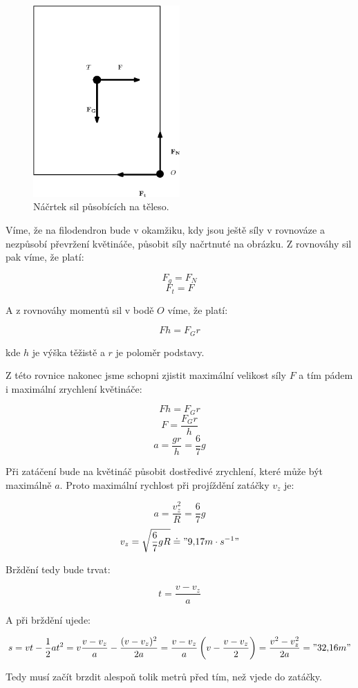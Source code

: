 \documentclass{fkssolpub}
\author{Ondřej Sedláček}
\begin{document}
\begin{figure}
	\begin{center}
		\includegraphics[width=0.5\textwidth]{2-fig.eps}
	\end{center}
	\caption{Náčrtek sil působících na těleso.}
	\label{fig:1}
\end{figure}

Víme, že na filodendron bude v okamžiku, kdy jsou ještě síly v rovnováze a nezpůsobí převržení květináče, působit síly načrtnuté na obrázku. Z rovnováhy sil pak víme, že platí:

\[
	F_g = F_N
\]
\[
	F_t = F
\]

A z rovnováhy momentů sil v bodě $O$ víme, že platí:

\[
	F h = F_G r
\]

kde $h$ je výška těžistě a $r$ je poloměr podstavy.

Z této rovnice nakonec jsme schopni zjistit maximální velikost síly $F$ a tím pádem i maximální zrychlení květináče:

\[
	F h = F_G r
\]
\[
	F = \frac{F_G r}{h}
\]
\[
	a = \frac{g r}{h} = \frac{6}{7} g
\]

Při zatáčení bude na květináč působit dostředivé zrychlení, které může být maximálně $a$. Proto maximální rychlost při projíždění zatáčky $v_z$ je:

\[
	a = \frac{v_z^2}{R} = \frac{6}{7} g
\]
\[
	v_z = \sqrt{\frac{6}{7} g R} \doteq "9{,}17 m \cdot s^{-1}"
\]

Brždění tedy bude trvat:

\[
	t = \frac{v - v_z}{a}
\]

A při brždění ujede:

\[
	s = v t - \frac{1}{2} a t^2 = v \frac{v - v_z}{a} - \frac{(v - v_z)^2}{2a} = \frac{v - v_z}{a} \left(v - \frac{v - v_z}{2} \right) = \frac{v^2 - v_z^2}{2a} = "32{,}16 m"
\]

Tedy musí začít brzdit alespoň tolik metrů před tím, než vjede do zatáčky.
\end{document}
